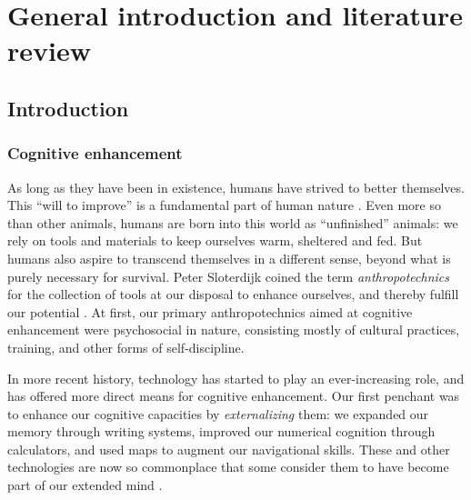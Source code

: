 \documentclass[11pt,]{memoir}
\def\defstyle{Ruled} %
\begin{document}
\clearpage
\pagestyle{\defstyle}
\mainmatter


\hypertarget{part-intro}{%
\part{General introduction and literature review}\label{part-intro}}

\hypertarget{intro-general}{%
\chapter{Introduction}\label{intro-general}}

\hypertarget{cognitive-enhancement}{%
\section{Cognitive enhancement}\label{cognitive-enhancement}}

As long as they have been in existence, humans have strived to better themselves. This ``will to improve'' is a fundamental part of human nature \autocite{Sloterdijk2009}. Even more so than other animals, humans are born into this world as ``unfinished'' animals: we rely on tools and materials to keep ourselves warm, sheltered and fed. But humans also aspire to transcend themselves in a different sense, beyond what is purely necessary for survival. Peter Sloterdijk coined the term \emph{anthropotechnics} for the collection of tools at our disposal to enhance ourselves, and thereby fulfill our potential \autocite*{Sloterdijk2001}. At first, our primary anthropotechnics aimed at cognitive enhancement were psychosocial in nature, consisting mostly of cultural practices, training, and other forms of self-discipline.

In more recent history, technology has started to play an ever-increasing role, and has offered more direct means for cognitive enhancement. Our first penchant was to enhance our cognitive capacities by \emph{externalizing} them: we expanded our memory through writing systems, improved our numerical cognition through calculators, and used maps to augment our navigational skills. These and other technologies are now so commonplace that some consider them to have become part of our extended mind \autocite{Clark1998}.
\end{document}
